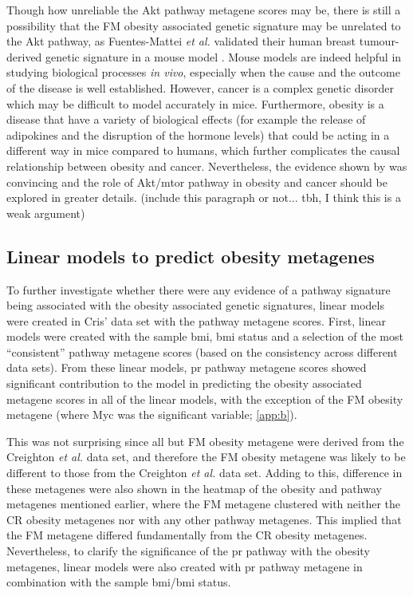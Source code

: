 Though how unreliable the Akt pathway metagene scores may be, there is still a possibility that the FM obesity associated genetic signature may be unrelated to the Akt pathway, as Fuentes-Mattei \textit{et al.} validated their human breast tumour-derived genetic signature in a mouse model \citep{Fuentes-Mattei2014}.
Mouse models are indeed helpful in studying biological processes \textit{in vivo}, especially when the cause and the outcome of the disease is well established.
However, cancer is a complex genetic disorder which may be difficult to model accurately in mice.
Furthermore, obesity is a disease that have a variety of biological effects (for example the release of adipokines and the disruption of the hormone levels) that could be acting in a different way in mice compared to humans, which further complicates the causal relationship between obesity and cancer.
Nevertheless, the evidence shown by \citet{Fuentes-Mattei2014} was convincing and the role of Akt/\gls{mtor} pathway in obesity and cancer should be explored in greater details.
(include this paragraph or not... tbh, I think this is a weak argument)

\subsection{Linear models to predict obesity metagenes}
\label{sub:linear_models_to_predict_obesity_metagenes}

To further investigate whether there were any evidence of a pathway signature being associated with the obesity associated genetic signatures, linear models were created in Cris' data set with the pathway metagene scores.
First, linear models were created with the sample \gls{bmi}, \gls{bmi} status and a selection of the most ``consistent'' pathway metagene scores (based on the consistency across different data sets).
From these linear models, \gls{pr} pathway metagene scores showed significant contribution to the model in predicting the obesity associated metagene scores in all of the linear models, with the exception of the FM obesity metagene (where Myc was the significant variable; \cref{app:b}).

This was not surprising since all but FM obesity metagene were derived from the Creighton \textit{et al.} data set, and therefore the FM obesity metagene was likely to be different to those from the Creighton \textit{et al.} data set.
Adding to this, difference in these metagenes were also shown in the heatmap of the obesity and pathway metagenes mentioned earlier, where the FM metagene clustered with neither the CR obesity metagenes nor with any other pathway metagenes.
This implied that the FM metagene differed fundamentally from the CR obesity metagenes.
Nevertheless, to clarify the significance of the \gls{pr} pathway with the obesity metagenes, linear models were also created with \gls{pr} pathway metagene in combination with the sample \gls{bmi}/\gls{bmi} status.

